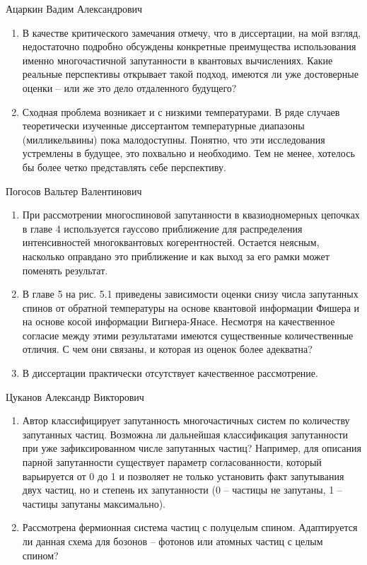 \begin{frame}{Ацаркин Вадим Александрович}
\begin{enumerate}
    \item В качестве критического замечания отмечу, что в диссертации, на мой взгляд, недостаточно подробно обсуждены конкретные преимущества использования именно многочастичной запутанности в квантовых вычислениях. Какие реальные перспективы открывает такой подход, имеются ли уже достоверные оценки – или же это дело отдаленного будущего? 

    \item Сходная проблема возникает и с низкими температурами. В ряде случаев теоретически изученные диссертантом температурные диапазоны (милликельвины) пока малодоступны. Понятно, что эти исследования устремлены в будущее, это похвально и необходимо. Тем не менее, хотелось бы более четко представлять себе перспективу. 
\end{enumerate}

\end{frame}

\begin{frame}{Погосов Вальтер Валентинович}
\begin{enumerate}
    \item При рассмотрении многоспиновой запутанности в квазиодномерных цепочках в главе 4 используется гауссово приближение для распределения интенсивностей многоквантовых когерентностей. Остается неясным, насколько оправдано это приближение и как выход за его рамки может поменять результат.

    \item В главе 5 на рис. 5.1 приведены зависимости оценки снизу числа запутанных спинов от обратной температуры на основе квантовой информации Фишера и на основе косой информации Вигнера-Янасе. Несмотря на качественное согласие между этими результатами имеются существенные количественные отличия. С чем они связаны, и которая из оценок более адекватна? 

    \item В диссертации практически отсутствует качественное рассмотрение. 
\end{enumerate}
\end{frame}

\begin{frame}{Цуканов Александр Викторович}
\begin{enumerate}
    \item Автор классифицирует запутанность многочастичных систем по количеству запутанных частиц. Возможна ли дальнейшая классификация запутанности при уже зафиксированном числе запутанных частиц? Например, для описания парной запутанности существует параметр согласованности, который варьируется от 0 до 1 и позволяет не только установить факт запутывания двух частиц, но и степень их запутанности (0 – частицы не запутаны, 1 – частицы запутаны максимально). 

    \item Рассмотрена фермионная система частиц с полуцелым спином. Адаптируется ли данная схема для бозонов – фотонов или атомных частиц с целым спином? 
\end{enumerate}

\end{frame}